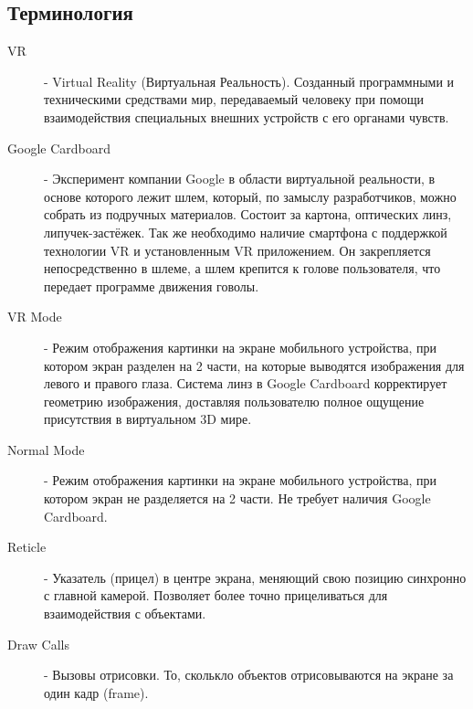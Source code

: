 \subsection{Терминология}
\begin{description}

\item[VR] - 
Virtual Reality (Виртуальная Реальность). Созданный программными и техническими средствами мир, передаваемый человеку при помощи взаимодействия специальных внешних устройств с его органами чувств. 

\item[Google Cardboard] - 
Эксперимент компании Google в области виртуальной реальности, в основе которого лежит шлем, который, по замыслу разработчиков, можно собрать из подручных материалов. Состоит за картона, оптических линз, липучек-застёжек. Так же необходимо наличие смартфона с поддержкой технологии VR и установленным VR приложением. Он закрепляется непосредственно в шлеме, а шлем крепится к голове пользователя, что передает программе движения говолы. 

\item[VR Mode] - 
Режим отображения картинки на экране мобильного устройства, при котором экран разделен на 2 части, на которые выводятся изображения для левого и правого глаза. Система линз в Google Cardboard корректирует геометрию изображения, доставляя пользователю полное ощущение присутствия в виртуальном 3D мире.

\item[Normal Mode] - 
Режим отображения картинки на экране мобильного устройства, при котором экран не разделяется на 2 части. Не требует наличия Google Cardboard. 

\item[Reticle] - 
Указатель (прицел) в центре экрана, меняющий свою позицию синхронно с главной камерой. Позволяет более точно прицеливаться для взаимодействия с объектами.

\item[Draw Calls] - 
Вызовы отрисовки. То, сколькло объектов отрисовываются на экране за один кадр (frame). 
\end{description}


